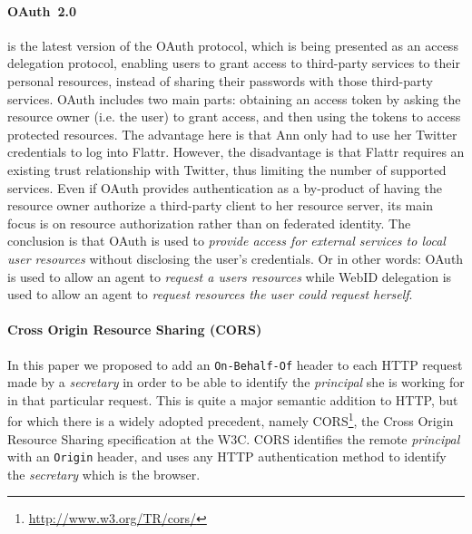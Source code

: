 \documentclass[a4paper]{llncs}
\begin{document}
\paragraph{OAuth~2.0}\cite{hardt-d-2012--a} is the latest version of the OAuth protocol, which is being presented as an access delegation protocol, enabling users to grant access to third-party services to their personal resources, instead of sharing their passwords with those third-party services.
OAuth includes two main parts: obtaining an access token by asking the resource owner (i.e. the user) to grant access, and then using the tokens to access protected resources. 
The advantage here is that Ann only had to use her Twitter credentials to log into Flattr.  However, the disadvantage is that Flattr requires an existing trust relationship with Twitter, thus limiting the number of supported services.
Even if OAuth provides authentication as a by-product of having the resource owner authorize a third-party client to her resource server, its main focus is on resource authorization rather than on federated identity.
The conclusion is that OAuth is used to \textit{provide access for external services to local user resources} without disclosing the user's credentials.
Or in other words: OAuth is used to allow an agent to \textit{request a users resources} while WebID delegation is used to allow an agent to \textit{request resources the user could request herself}.

\paragraph{Cross Origin Resource Sharing (CORS)}
In this paper we proposed to add an \lstinline|On-Behalf-Of| header to each HTTP request made by a \textit{secretary} in order to be able to identify the \textit{principal} she is working for in that particular request.
This is quite a major semantic addition to HTTP, but for which there is a widely adopted precedent, namely CORS\footnote{\url{http://www.w3.org/TR/cors/}}, the Cross Origin Resource Sharing specification at the W3C.
CORS identifies the remote \textit{principal} with an \lstinline|Origin| header, and uses any HTTP authentication method to identify the \textit{secretary} which is the browser.
\end{document}
